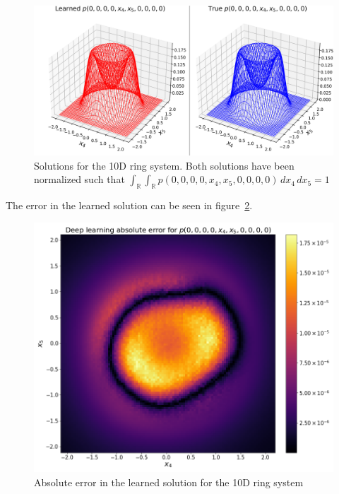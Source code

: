 \begin{figure}[!ht]
    \centering\includegraphics[scale=0.6
]{steady-fp/plots/10D-surface.png}
\caption{Solutions for the 10D ring system. Both solutions have been normalized such that $\int_{\mathbb R}\int_{\mathbb R}p(0, 0, 0, 0, x_4, x_5, 0, 0, 0, 0)\,dx_4\,dx_5=1$} 
    \label{fig:10D-surface--steady-fp}
\end{figure}
The error in the learned solution can be seen in figure~\ref{fig:10D-error--steady-fp}.

\begin{figure}[!ht]
    \centering
\includegraphics[scale=0.32]{steady-fp/plots/10D-error.png}
\caption{Absolute error in the learned solution for the 10D ring system}
    \label{fig:10D-error--steady-fp}
\end{figure}

    

